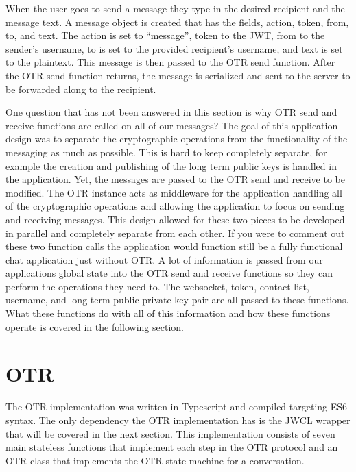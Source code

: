 When the user goes to send a message they type in the desired recipient and the message text.
A message object is created that has the fields, action, token, from, to, and text. The action is set to “message”, token to the JWT, from to the sender's username, to is set to the provided recipient's username, and text is set to the plaintext. This message is then passed to the OTR send function. After the OTR send function returns, the message is serialized and sent to the server to be forwarded along to the recipient.


One question that has not been answered in this section is why OTR send and receive functions are called on all of our messages? The goal of this application design was to separate the cryptographic operations from the functionality of the messaging as much as possible. This is hard to keep completely separate, for example the creation and publishing of the long term public keys is handled in the application. Yet, the messages are passed to the OTR send and receive to be modified. The OTR instance acts as middleware for the application handling all of the cryptographic operations and allowing the application to focus on sending and receiving messages. This design allowed for these two pieces to be developed in parallel and completely separate from each other. If you were to comment out these two function calls the application would function still be a fully functional chat application just without OTR. A lot of information is passed from our applications global state into the OTR send and receive functions so they can perform the operations they need to. The websocket, token, contact list, username, and long term public private key pair are all passed to these functions. What these functions do with all of this information and how these functions operate is covered in the following section.


\section{OTR}


The OTR implementation was written in Typescript and compiled targeting ES6 syntax. The only dependency the OTR implementation has is the JWCL wrapper that will be covered in the next section. This implementation consists of seven main stateless functions that implement each step in the OTR protocol and an OTR class that implements the OTR state machine for a conversation. 



